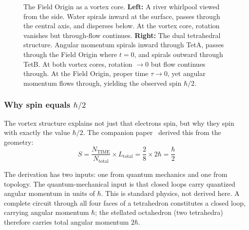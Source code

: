 \documentclass[aps,prd,preprint,superscriptaddress,showpacs,preprintnumbers,amsmath,amssymb,nofootinbib]{revtex4-2}
\begin{document}
\begin{figure}[H]
\caption{The Field Origin as a vortex core. \textbf{Left:} A river whirlpool viewed from the side. Water spirals inward at the surface, passes through the central axis, and disperses below. At the vortex core, rotation vanishes but through-flow continues. \textbf{Right:} The dual tetrahedral structure. Angular momentum spirals inward through TetA, passes through the Field Origin where $t = 0$, and spirals outward through TetB. At both vortex cores, rotation $\to 0$ but flow continues through. At the Field Origin, proper time $\tau \to 0$, yet angular momentum flows through, yielding the observed spin $\hbar/2$.}
\label{fig:vortex}
\end{figure}

\subsubsection*{Why spin equals $\hbar/2$}

The vortex structure explains not just that electrons spin, but why they spin with exactly the value $\hbar/2$. The companion paper~\cite{paper6} derived this from the geometry:
\begin{equation}
S = \frac{N_{\text{TIME}}}{N_{\text{total}}} \times L_{\text{total}} = \frac{2}{8} \times 2\hbar = \frac{\hbar}{2}
\label{eq:spin}
\end{equation}

The derivation has two inputs: one from quantum mechanics and one from topology. The quantum-mechanical input is that closed loops carry quantized angular momentum in units of $\hbar$. This is standard physics, not derived here. A complete circuit through all four faces of a tetrahedron constitutes a closed loop, carrying angular momentum $\hbar$; the stellated octahedron (two tetrahedra) therefore carries total angular momentum $2\hbar$.
\end{document}
